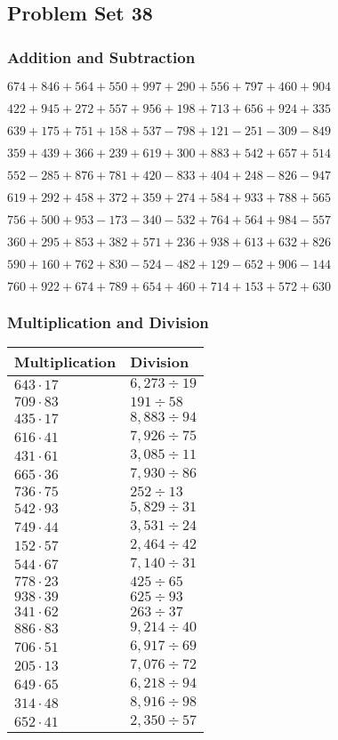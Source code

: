 \hypertarget{problem-set-38-2}{%
\subsection{Problem Set 38}\label{problem-set-38-2}}

\hypertarget{addition-and-subtraction-138}{%
\subsubsection{Addition and
Subtraction}\label{addition-and-subtraction-138}}

\(674 + 846 + 564 + 550 + 997 + 290 + 556 + 797 + 460 + 904\)

\(422 + 945 + 272 + 557 + 956 + 198 + 713 + 656 + 924 + 335\)

\(639 + 175 + 751 + 158 + 537 - 798 + 121 - 251 - 309 - 849\)

\(359 + 439 + 366 + 239 + 619 + 300 + 883 + 542 + 657 + 514\)

\(552 - 285 + 876 + 781 + 420 - 833 + 404 + 248 - 826 - 947\)

\(619 + 292 + 458 + 372 + 359 + 274 + 584 + 933 + 788 + 565\)

\(756 + 500 + 953 - 173 - 340 - 532 + 764 + 564 + 984 - 557\)

\(360 + 295 + 853 + 382 + 571 + 236 + 938 + 613 + 632 + 826\)

\(590 + 160 + 762 + 830 - 524 - 482 + 129 - 652 + 906 - 144\)

\(760 + 922 + 674 + 789 + 654 + 460 + 714 + 153 + 572 + 630\)

\hypertarget{multiplication-and-division-138}{%
\subsubsection{Multiplication and
Division}\label{multiplication-and-division-138}}

\begin{longtable}[]{@{}ll@{}}
\toprule
Multiplication & Division\tabularnewline
\midrule
\endhead
\(643 \cdot 17\) & \(6,273÷19\)\tabularnewline
\(709 \cdot 83\) & \(191÷58\)\tabularnewline
\(435 \cdot 17\) & \(8,883÷94\)\tabularnewline
\(616 \cdot 41\) & \(7,926÷75\)\tabularnewline
\(431 \cdot 61\) & \(3,085÷11\)\tabularnewline
\(665 \cdot 36\) & \(7,930÷86\)\tabularnewline
\(736 \cdot 75\) & \(252÷13\)\tabularnewline
\(542 \cdot 93\) & \(5,829÷31\)\tabularnewline
\(749 \cdot 44\) & \(3,531÷24\)\tabularnewline
\(152 \cdot 57\) & \(2,464÷42\)\tabularnewline
\(544 \cdot 67\) & \(7,140÷31\)\tabularnewline
\(778 \cdot 23\) & \(425÷65\)\tabularnewline
\(938 \cdot 39\) & \(625÷93\)\tabularnewline
\(341 \cdot 62\) & \(263÷37\)\tabularnewline
\(886 \cdot 83\) & \(9,214÷40\)\tabularnewline
\(706 \cdot 51\) & \(6,917÷69\)\tabularnewline
\(205 \cdot 13\) & \(7,076÷72\)\tabularnewline
\(649 \cdot 65\) & \(6,218÷94\)\tabularnewline
\(314 \cdot 48\) & \(8,916÷98\)\tabularnewline
\(652 \cdot 41\) & \(2,350÷57\)\tabularnewline
\bottomrule
\end{longtable}


